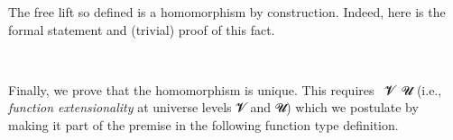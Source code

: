The free lift so defined is a homomorphism by construction. Indeed, here is the formal
statement and (trivial) proof of this fact.
\ccpad
\begin{code}%
\>[1]\AgdaSpace{}%
\AgdaSymbol{:}\AgdaSpace{}%
\AgdaSymbol{(}\AgdaSpace{}%
\AgdaSymbol{:}\AgdaSpace{}%
\AgdaSpace{}%
\AgdaSpace{}%
\AgdaSymbol{)}\AgdaSpace{}%
\AgdaSpace{}%
\AgdaSymbol{(}\AgdaSpace{}%
\AgdaSpace{}%
\AgdaSpace{}%
\AgdaSpace{}%
\AgdaSymbol{)}\AgdaSpace{}%
\AgdaSpace{}%
\AgdaSpace{}%
\AgdaSymbol{(}\AgdaSpace{}%
\AgdaSymbol{)}\AgdaSpace{}%
\<%
\\
%
\>[1]\AgdaSpace{}%
\AgdaSpace{}%
\AgdaSpace{}%
\AgdaSymbol{=}\AgdaSpace{}%
\AgdaSpace{}%
\AgdaSpace{}%
\AgdaSpace{}%
\AgdaOperator{\AgdaInductiveConstructor{,}}\AgdaSpace{}%
\AgdaSpace{}%
\AgdaSpace{}%
\AgdaSpace{}%
\AgdaSpace{}%
\AgdaSpace{}%
\AgdaSymbol{(}\AgdaSpace{}%
\AgdaSpace{}%
\AgdaSymbol{)}\AgdaSpace{}%
\<%
\end{code}
\ccpad
Finally, we prove that the homomorphism is unique.  This requires
~\ab 𝓥~\ab 𝓤 (i.e., \emph{function extensionality} at universe levels
\ab 𝓥 and \ab 𝓤) which we postulate by making it part of the premise in the
following function type definition.
\ccpad
